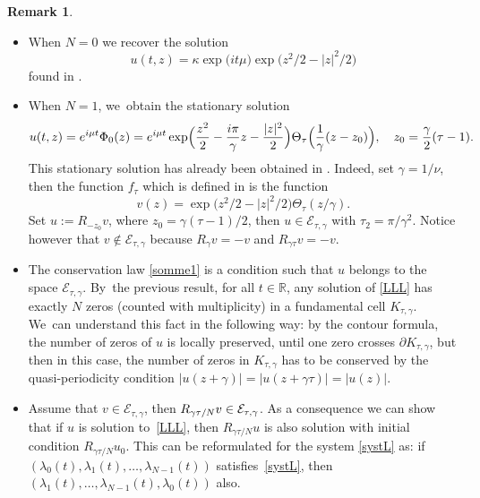\documentclass[JEP,XML,SOM,Unicode,NoFloatCountersInSection,published]{cedram}
\theoremstyle{definition}
\newtheorem{remark}[theorem]{Remark}
\let\EE\exp
\let\dis\relax
\newcommand\R{\mathbb R}
\newcommand\E{\mathcal E}
\begin{document}
\skpt\begin{remark}\label{rem14}
\begin{itemize}
\item
When $N=0$ we recover the solution
\[
u(t,z) = \kappa \EE\bigl({it\mu}\bigr)\EE\bigl({z^2}/2 - {|z|^2}/2\bigr) 
\]
found in \cite[Prop.\,6.1]{GGT}.

\item
When $N=1$, we~obtain the stationary solution
\begin{equation*}
u(t,z)= e^{i\mu t}\Phi_0(z) =e^{i\mu t}\EE\Bigl({ \frac{z^2}2 -\frac{i\pi}{\gamma} z - \frac{|z|^2}2}\Bigr) \Theta_{\tau}\Bigl(\frac{1}{\gamma}(z-z_0)\Bigr), \quad z_0 = \frac{\gamma}{2}(\tau-1).
\end{equation*}
This stationary solution has already been obtained in \cite{ABN}. Indeed, set $\gamma=1/{\nu}$, then the function $f_\tau$ which is defined in \cite[Th.\,1.4]{ABN} is the function
\[
v(z)=\EE\bigl(z^2/2-|z|^2/2\bigr)\Theta_\tau({z}/{\gamma}).
\]
Set $u:=R_{-z_0}v$, where $z_0 = {\gamma}(\tau-1)/2$, then $u \in \mathcal{E}_{\tau,\gamma}$ with $\tau_2=\pi/\gamma^2$. Notice however that $v \notin \mathcal{E}_{\tau,\gamma}$ because $ R_\gamma v=-v$ and $ R_{\gamma \tau} v=-v$.

\item
The conservation law \eqref{somme1} is a condition such that $u$ belongs to the space $\E_{\tau,\gamma}$. By~the previous result, for all $t\in \R$, any solution of \eqref{LLL} has exactly $N$ zeros (counted with multiplicity) in a fundamental cell $K_{\tau,\gamma}$. We~can understand this fact in the following way: by the contour formula, the number of zeros of $u$ is locally preserved, until one zero crosses $\partial K_{\tau,\gamma}$, but then in this case, the number of zeros in $K_{\tau,\gamma}$ has to be conserved by the quasi-periodicity condition $\vert u(z+\gamma)\vert= \vert u(z+\gamma\tau)\vert=\vert u(z)\vert$.

\item
Assume that $v\in \E_{\tau,\gamma}$, then $\dis R_{{\gamma \tau}/N}v \in \E_{\tau,\gamma}$. As a consequence we can show that if $u$ is solution to~\eqref{LLL}, then $R_{{\gamma \tau}/N}u$ is also solution with initial condition $R_{{\gamma \tau}/N}u_0$. This can be reformulated for the system \eqref{systL} as: if $(\lambda_0(t),\lambda_1(t), \dots, \lambda_{N-1}(t))$ satisfies~\eqref{systL}, then $(\lambda_1(t), \dots, \lambda_{N-1}(t),\lambda_{0}(t))$ also.
\end{itemize}
\end{remark}
\end{document}
